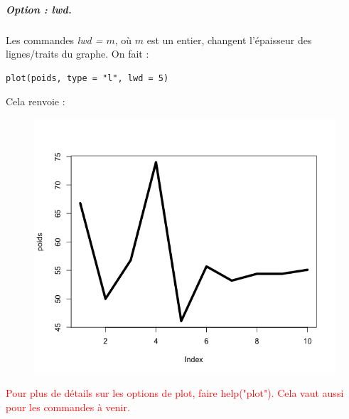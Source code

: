 \subparagraph{Option : lwd.}
Les commandes \textit{lwd = $m$}, où $m$ est un entier, changent l'épaisseur des lignes/traits du graphe.\newline
On fait :
\begin{lstlisting}[language=html]
plot(poids, type = "l", lwd = 5)
\end{lstlisting}
Cela renvoie :
\begin{figure}[H]\begin{center}\includegraphics[scale=0.4]{ilu/gra25.png}\end{center}\end{figure}
\textcolor{red}{Pour plus de détails sur les options de plot, faire help("plot"). Cela vaut aussi pour les commandes à venir.}
